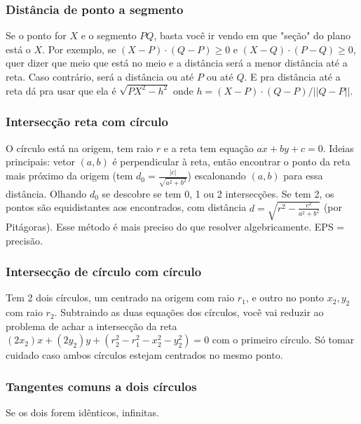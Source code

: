 \subsubsection{Distância de ponto a segmento}

Se o ponto for $X$ e o segmento $PQ$, basta você ir vendo em que "seção" do plano
está o $X$. Por exemplo, se $(X-P) \cdot (Q-P) \geq 0$ e $(X-Q) \cdot (P-Q) \geq 0$,
quer dizer que meio que está no meio e a distância será a menor distância até a reta.
Caso contrário, será a distância ou até $P$ ou até $Q$. E pra distância até a reta dá 
pra usar que ela é $\sqrt{PX^2 - h^2}$ onde $h = (X-P) \cdot (Q-P) / \vert \vert Q - P \vert \vert$.

\subsubsection{Intersecção reta com círculo}

O círculo está na origem, tem raio $r$ e a reta tem equação $ax + by + c = 0$. Ideias principais: vetor $(a, b)$ é perpendicular à reta, então encontrar o ponto da reta mais próximo da origem (tem $d_0 = \frac{|c|}{\sqrt{a^2 + b^2}}$) escalonando $(a, b)$ para essa distância. Olhando $d_0$ se descobre se tem 0, 1 ou 2 intersecções. Se tem 2, os pontos são equidistantes aos encontrados, com distância $d = \sqrt{r^2 - \frac{c^2}{a^2 + b^2}}$ (por Pitágoras). Esse método é mais preciso do que resolver algebricamente. EPS =  precisão.


\subsubsection{Intersecção de círculo com círculo}

Tem 2 dois círculos, um centrado na origem com raio $r_1$, e outro no ponto $x_2, y_2$ com raio $r_2$. Subtraindo as duas equações dos círculos, você vai reduzir ao problema de achar a intersecção da reta $(2x_2)x + (2y_2)y + (r_2^2 - r_1^2 - x_2^2 - y_2^2) = 0$ com o primeiro círculo. Só tomar cuidado caso ambos círculos estejam centrados no mesmo ponto.

\subsubsection{Tangentes comuns a dois círculos}

Se os dois forem idênticos, infinitas.

